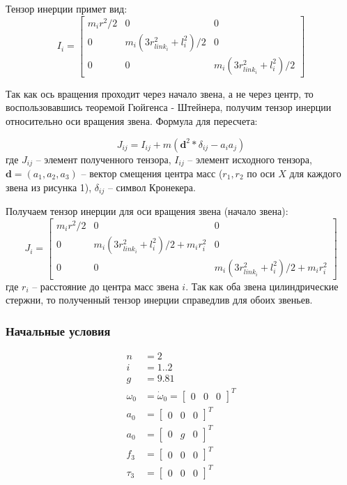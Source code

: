 \documentclass[a4paper,14pt]{extreport}
\begin{document}
Тензор инерции примет вид:
\begin{equation}
	I_i = 
	\begin{bmatrix}
	m_{i} r^{2} / 2 & 0 & 0 \\ 
	0 &    	m_i (3 r_{link_i}^2 + l_i^2) / 2 & 0\\
	0 & 0 & m_i (3 r_{link_i}^2 + l_i^2) / 2
	\end{bmatrix}
\end{equation}

Так как ось вращения проходит через начало звена, а не через центр, то воспользовавшись теоремой Гюйгенса - Штейнера, получим тензор инерции относительно оси вращения звена. Формула для пересчета:

\begin{equation}
	J_{ij} = I_{ij} + m (\textbf{d}^2 * \delta_{ij} -a_i a_j)
\end{equation}
где $J_{ij}$ -- элемент полученного тензора, $I_{ij}$ -- элемент исходного тензора, $\textbf{d} = (a_1, a_2, a_3)$ -- вектор смещения центра масс ($r_1, r_2$ по оси $X$ для каждого звена из рисунка 1), $\delta_{ij}$ -- символ Кронекера.

Получаем тензор инерции для оси вращения звена (начало звена):
\begin{equation}
	J_i = 
\begin{bmatrix}
m_{i} r^{2} / 2 & 0 & 0 \\ 
0 &    	m_i (3 r_{link_i}^2 + l_i^2) / 2 + m_i r_i^2 & 0\\
0 & 0 & m_i (3 r_{link_i}^2 + l_i^2) / 2 + m_i r_i^2
\end{bmatrix}
\end{equation}
где $r_i$ -- расстояние до центра масс звена $i$. Так как оба звена цилиндрические стержни, то полученный тензор инерции справедлив для обоих звеньев.

\subsubsection{Начальные условия}

\begin{align}
	n &= 2\\
	i &= 1..2\\
	g &= 9.81\\
	\omega_0 &= \dot \omega_0 =
	\begin{bmatrix}
		0&0&0
	\end{bmatrix}^T\\
	a_0 &=
	\begin{bmatrix}
0&0&0
\end{bmatrix}^T\\
	a_{0} &=
	\begin{bmatrix}
0&g&0
\end{bmatrix}^T\\
	f_{3} &=
\begin{bmatrix}
0&0&0
\end{bmatrix}^T\\
	\tau_{3} &=
\begin{bmatrix}
0&0&0
\end{bmatrix}^T
\end{align}
\end{document}
